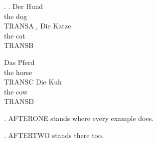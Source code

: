 

\ex. \a. \gll Der Hund \\ the dog \\
\glt TRANSA
\b. \gll Die Katze \\ the cat \\
\glt TRANSB

\begin{exe}
\ex \gll Das Pferd \\ the horse \\
\glt TRANSC
\ex \gll Die Kuh \\ the cow \\
\glt TRANSD
\end{exe}

\ex. AFTERONE stands where every example does.

\ex. AFTERTWO stands there too.


